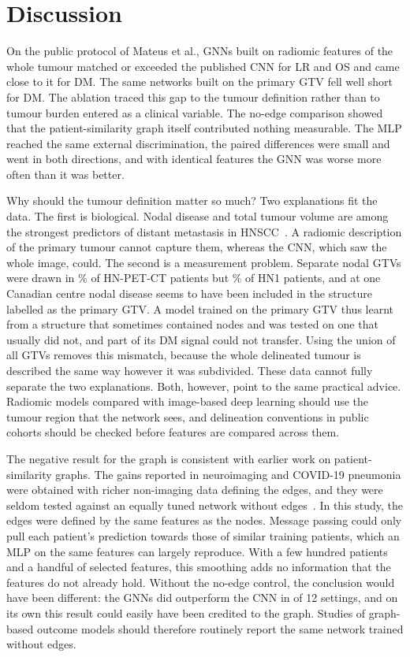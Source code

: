 \documentclass[pdflatex,iicol,sn-nature]{sn-jnl}
\begin{document}
\section{Discussion}\label{sec:discussion}
On the public protocol of Mateus et al., GNNs built on radiomic features of the whole tumour matched or exceeded the published CNN for LR and OS and came close to it for DM. The same networks built on the primary GTV fell well short for DM. The ablation traced this gap to the tumour definition rather than to tumour burden entered as a clinical variable. The no-edge comparison showed that the patient-similarity graph itself contributed nothing measurable. The MLP reached the same external discrimination, the paired differences were small and went in both directions, and with identical features the GNN was worse more often than it was better.

Why should the tumour definition matter so much? Two explanations fit the data. The first is biological. Nodal disease and total tumour volume are among the strongest predictors of distant metastasis in HNSCC~\cite{kjems2023volume,jensen2020nodalfdg}. A radiomic description of the primary tumour cannot capture them, whereas the CNN, which saw the whole image, could. The second is a measurement problem. Separate nodal GTVs were drawn in \nodalPctCan\% of HN-PET-CT patients but \nodalPctMAA\% of HN1 patients, and at one Canadian centre nodal disease seems to have been included in the structure labelled as the primary GTV. A model trained on the primary GTV thus learnt from a structure that sometimes contained nodes and was tested on one that usually did not, and part of its DM signal could not transfer. Using the union of all GTVs removes this mismatch, because the whole delineated tumour is described the same way however it was subdivided. These data cannot fully separate the two explanations. Both, however, point to the same practical advice. Radiomic models compared with image-based deep learning should use the tumour region that the network sees, and delineation conventions in public cohorts should be checked before features are compared across them.

The negative result for the graph is consistent with earlier work on patient-similarity graphs. The gains reported in neuroimaging and COVID-19 pneumonia were obtained with richer non-imaging data defining the edges, and they were seldom tested against an equally tuned network without edges~\cite{parisot2018population,keicher2023covid}. In this study, the edges were defined by the same features as the nodes. Message passing could only pull each patient's prediction towards those of similar training patients, which an MLP on the same features can largely reproduce. With a few hundred patients and a handful of selected features, this smoothing adds no information that the features do not already hold. Without the no-edge control, the conclusion would have been different: the GNNs did outperform the CNN in \winsGraph{} of 12 settings, and on its own this result could easily have been credited to the graph. Studies of graph-based outcome models should therefore routinely report the same network trained without edges.
\end{document}
